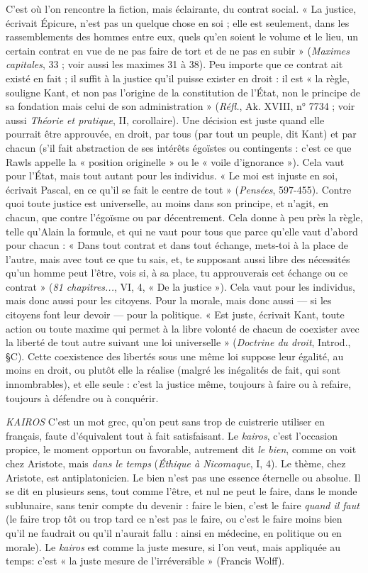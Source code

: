 {C’est où l’on rencontre la fiction, mais éclairante, du contrat social. « La
justice, écrivait Épicure, n’est pas un quelque chose en soi ; elle est seulement,
dans les rassemblements des hommes entre eux, quels qu’en soient le volume et
le lieu, un certain contrat en vue de ne pas faire de tort et de ne pas en subir »
({\it Maximes capitales}, 33 ; voir aussi les maximes 31 à 38). Peu importe que ce
contrat ait existé en fait ; il suffit à la justice qu’il puisse exister en droit : il est
« la règle, souligne Kant, et non pas l’origine de la constitution de l’État, non
le principe de sa fondation mais celui de son administration » ({\it Réfl.}, Ak. XVIII,
n° 7734 ; voir aussi {\it Théorie et pratique}, II, corollaire). Une décision est juste
quand elle pourrait être approuvée, en droit, par tous (par tout un peuple, dit
Kant) et par chacun (s’il fait abstraction de ses intérêts égoïstes ou contingents :
c’est ce que Rawls appelle la « position originelle » ou le « voile d’ignorance »).
Cela vaut pour l’État, mais tout autant pour les individus. « Le moi est injuste
en soi, écrivait Pascal, en ce qu’il se fait le centre de tout » ({\it Pensées}, 597-455).
Contre quoi toute justice est universelle, au moins dans son principe, et n’agit,
en chacun, que contre l’égoïsme ou par décentrement. Cela donne à peu près
la règle, telle qu’Alain la formule, et qui ne vaut pour tous que parce qu’elle
vaut d’abord pour chacun : « Dans tout contrat et dans tout échange, mets-toi
à la place de l’autre, mais avec tout ce que tu sais, et, te supposant aussi libre
des nécessités qu’un homme peut l'être, vois si, à sa place, tu approuverais cet
échange ou ce contrat » ({\it 81 chapitres...}, VI, 4, « De la justice »). Cela vaut pour
les individus, mais donc aussi pour les citoyens. Pour la morale, mais donc aussi
— si les citoyens font leur devoir — pour la politique. « Est juste, écrivait Kant,
toute action ou toute maxime qui permet à la libre volonté de chacun de
coexister avec la liberté de tout autre suivant une loi universelle » ({\it Doctrine du
droit}, Introd., \S C). Cette coexistence des libertés sous une même loi suppose
leur égalité, au moins en droit, ou plutôt elle la réalise (malgré les inégalités de
fait, qui sont innombrables), et elle seule : c’est la justice même, toujours à faire
ou à refaire, toujours à défendre ou à conquérir.

{\it KAIROS} C'est un mot grec, qu’on peut sans trop de cuistrerie utiliser en
français, faute d’équivalent tout à fait satisfaisant. Le {\it kairos}, c’est
l’occasion propice, le moment opportun ou favorable, autrement dit {\it le bien},
comme on voit chez Aristote, mais {\it dans le temps} ({\it Éthique à Nicomaque}, I, 4).
Le thème, chez Aristote, est antiplatonicien. Le bien n’est pas une essence éternelle
ou absolue. Il se dit en plusieurs sens, tout comme l’être, et nul ne peut le
faire, dans le monde sublunaire, sans tenir compte du devenir : faire le bien,
c’est le faire {\it quand il faut} (le faire trop tôt ou trop tard ce n’est pas le faire, ou
c’est le faire moins bien qu’il ne faudrait ou qu’il n’aurait fallu : ainsi en médecine,
en politique ou en morale). Le {\it kairos} est comme la juste mesure, si l’on
veut, mais appliquée au temps: c’est « la juste mesure de l’irréversible »
(Francis Wolff).

}
